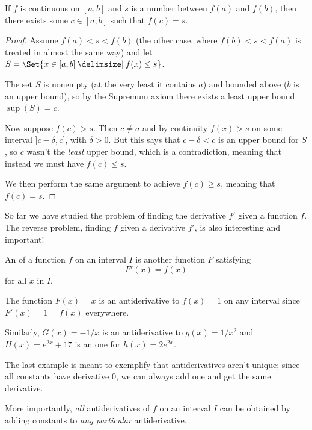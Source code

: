 \begin{theorem}
	If $f$ is continuous on $[a, b]$ and $s$ is a number between $f(a)$ and $f(b)$, then there exists some $c \in [a, b]$ such that $f(c) = s$.
\end{theorem}

\begin{proof}
	Assume $f(a) < s < f(b)$ (the other case, where $f(b) < s < f(a)$ is treated in almost the same way) and let $S = \Set{x \in [a, b] \given f(x) \leq s}$.

	The set $S$ is nonempty (at the very least it contains $a$) and bounded above ($b$ is an upper bound), so by the Supremum axiom there exists a least upper bound $\sup(S) = c$.

	Now suppose $f(c) > s$.
	Then $c \neq a$ and by continuity $f(x) > s$ on some interval ${]{c - \delta, c}]}$, with $\delta > 0$.
	But this says that $c - \delta < c$ is an upper bound for $S$, so $c$ wasn't the \emph{least} upper bound, which is a contradiction, meaning that instead we must have $f(c) \leq s$.

	We then perform the same argument to achieve $f(c) \geq s$, meaning that $f(c) = s$.
\end{proof}


So far we have studied the problem of finding the derivative $f'$ given a function $f$.
The reverse problem, finding $f$ given a derivative $f'$, is also interesting and important!

\begin{definition}[Antiderivative]
	An  of a function $f$ on an interval $I$ is another function $F$ satisfying
	\[
		F'(x) = f(x)
	\]
	for all $x$ in $I$.
\end{definition}

\begin{example}
	The function $F(x) = x$ is an antiderivative to $f(x) = 1$ on any interval since $F'(x) = 1 = f(x)$ everywhere.

	Similarly, $G(x) = -1/x$ is an antiderivative to $g(x) = 1/x^2$ and $H(x) = e^{2x} + 17$ is an one for $h(x) = 2 e^{2 x}$.
\end{example}

\noindent
The last example is meant to exemplify that antiderivatives aren't unique; since all constants have derivative $0$, we can always add one and get the same derivative.

More importantly, \emph{all} antiderivatives of $f$ on an interval $I$ can be obtained by adding constants to \emph{any particular} antiderivative.

